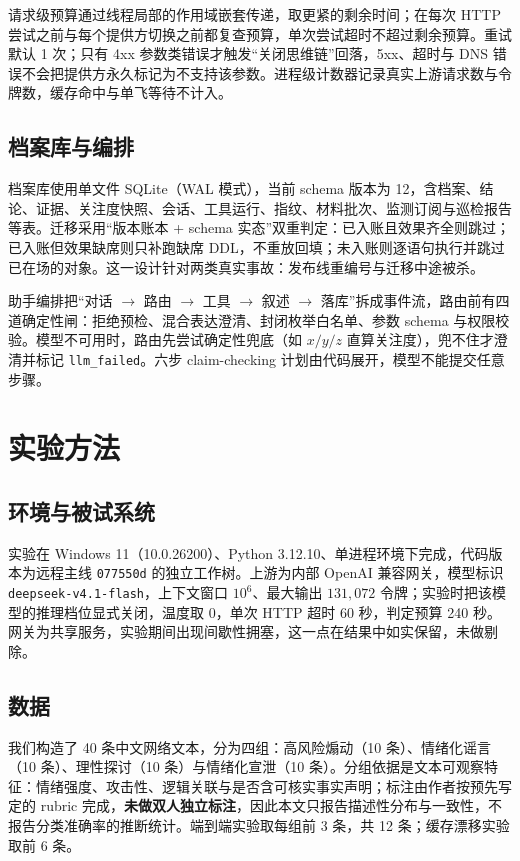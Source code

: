 \documentclass[12pt,a4paper,fontset=windows]{ctexart}
\begin{document}
请求级预算通过线程局部的作用域嵌套传递，取更紧的剩余时间；在每次 HTTP 尝试之前与每个提供方切换之前都复查预算，单次尝试超时不超过剩余预算。重试默认 1 次；只有 4xx 参数类错误才触发“关闭思维链”回落，5xx、超时与 DNS 错误不会把提供方永久标记为不支持该参数。进程级计数器记录真实上游请求数与令牌数，缓存命中与单飞等待不计入。

\subsection{档案库与编排}

档案库使用单文件 SQLite（WAL 模式），当前 schema 版本为 12，含档案、结论、证据、关注度快照、会话、工具运行、指纹、材料批次、监测订阅与巡检报告等表。迁移采用“版本账本 + schema 实态”双重判定：已入账且效果齐全则跳过；已入账但效果缺席则只补跑缺席 DDL，不重放回填；未入账则逐语句执行并跳过已在场的对象。这一设计针对两类真实事故：发布线重编号与迁移中途被杀。

助手编排把“对话 $\rightarrow$ 路由 $\rightarrow$ 工具 $\rightarrow$ 叙述 $\rightarrow$ 落库”拆成事件流，路由前有四道确定性闸：拒绝预检、混合表达澄清、封闭枚举白名单、参数 schema 与权限校验。模型不可用时，路由先尝试确定性兜底（如 $x/y/z$ 直算关注度），兜不住才澄清并标记 \texttt{llm\_failed}。六步 claim-checking 计划由代码展开，模型不能提交任意步骤。

\section{实验方法}\label{sec:method}

\subsection{环境与被试系统}

实验在 Windows 11（10.0.26200）、Python 3.12.10、单进程环境下完成，代码版本为远程主线 \texttt{077550d} 的独立工作树。上游为内部 OpenAI 兼容网关，模型标识 \texttt{deepseek-v4.1-flash}，上下文窗口 $10^6$、最大输出 $131{,}072$ 令牌；实验时把该模型的推理档位显式关闭，温度取 0，单次 HTTP 超时 60 秒，判定预算 240 秒。网关为共享服务，实验期间出现间歇性拥塞，这一点在结果中如实保留，未做剔除。

\subsection{数据}

我们构造了 40 条中文网络文本，分为四组：高风险煽动（10 条）、情绪化谣言（10 条）、理性探讨（10 条）与情绪化宣泄（10 条）。分组依据是文本可观察特征：情绪强度、攻击性、逻辑关联与是否含可核实事实声明；标注由作者按预先写定的 rubric 完成，\textbf{未做双人独立标注}，因此本文只报告描述性分布与一致性，不报告分类准确率的推断统计。端到端实验取每组前 3 条，共 12 条；缓存漂移实验取前 6 条。
\end{document}

